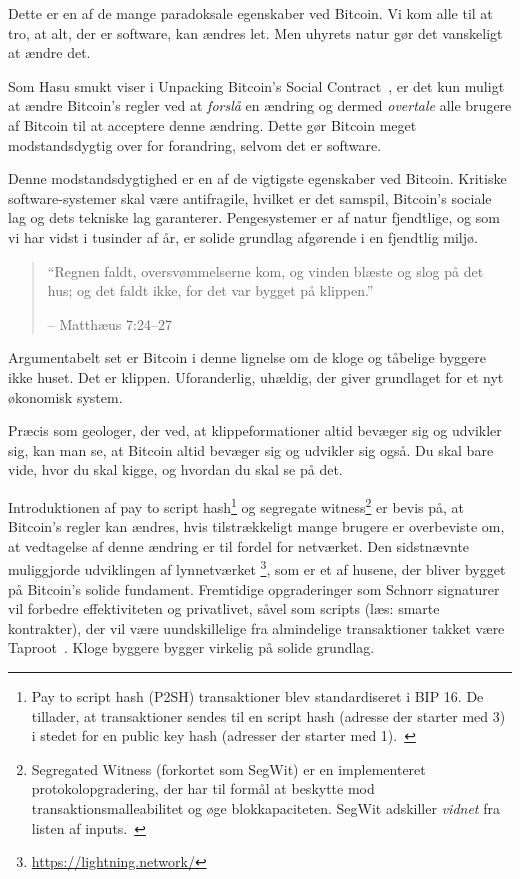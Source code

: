 Dette er en af de mange paradoksale egenskaber ved Bitcoin. Vi kom alle
til at tro, at alt, der er software, kan ændres let. Men
uhyrets natur gør det vanskeligt at ændre det.

Som Hasu smukt viser i Unpacking Bitcoin's Social
Contract~\cite{social-contract}, er det kun muligt at ændre Bitcoin's regler
ved at \textit{forslå} en ændring og dermed \textit{overtale} alle brugere
af Bitcoin til at acceptere denne ændring. Dette gør Bitcoin meget modstandsdygtig over for forandring,
selvom det er software.

Denne modstandsdygtighed er en af de vigtigste egenskaber ved Bitcoin.
Kritiske software-systemer skal være antifragile, hvilket er det
samspil, Bitcoin's sociale lag og dets tekniske lag garanterer.
Pengesystemer er af natur fjendtlige, og som vi har vidst i
tusinder af år, er solide grundlag afgørende i en fjendtlig
miljø.

\begin{quotation}\begin{samepage}
    \enquote{Regnen faldt, oversvømmelserne kom, og vinden blæste og slog på
    det hus; og det faldt ikke, for det var bygget på klippen.}
    \begin{flushright} -- Matthæus 7:24--27
\end{flushright}\end{samepage}\end{quotation}

Argumentabelt set er Bitcoin i denne lignelse om de kloge og tåbelige byggere ikke huset. Det er klippen. Uforanderlig, uhældig, der giver grundlaget for et nyt økonomisk system.

Præcis som geologer, der ved, at klippeformationer altid bevæger sig
og udvikler sig, kan man se, at Bitcoin altid bevæger sig og udvikler sig også.
Du skal bare vide, hvor du skal kigge, og hvordan du skal se på det.

Introduktionen af pay to script hash\footnote{ Pay to script hash (P2SH)
transaktioner blev standardiseret i BIP 16. De tillader, at transaktioner sendes til
en script hash (adresse der starter med 3) i stedet for en public key hash (adresser
der starter med 1).~\cite{btcwiki:p2sh}} og segregate
witness\footnote{Segregated Witness (forkortet som SegWit) er en implementeret
protokolopgradering, der har til formål at beskytte mod transaktionsmalleabilitet
og øge blokkapaciteten. SegWit adskiller \textit{vidnet} fra listen
af inputs.~\cite{btcwiki:segwit}} er bevis på, at Bitcoin's regler kan ændres,
hvis tilstrækkeligt mange brugere er overbeviste om, at vedtagelse af denne ændring er til fordel for
netværket. Den sidstnævnte muliggjorde udviklingen af lynnetværket
\footnote{\url{https://lightning.network/}}, som er et af husene,
der bliver bygget på Bitcoin's solide fundament. Fremtidige opgraderinger som Schnorr
signaturer~\cite{bip:schnorr} vil forbedre effektiviteten og privatlivet, såvel som
scripts (læs: smarte kontrakter), der vil være uundskillelige fra almindelige
transaktioner takket være Taproot~\cite{taproot}. Kloge byggere bygger virkelig på
solide grundlag.

